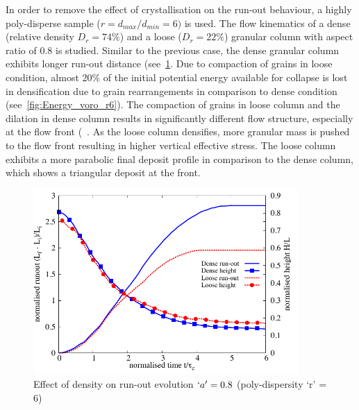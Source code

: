 In order to remove the effect of crystallisation on the run-out behaviour, a 
highly poly-disperse sample ($r = d_{max}/d_{min} = 6)$ is used. 
The flow kinematics of a dense (relative density $D_r = 74\%$) and a loose 
($D_r = 22\%$) granular column with aspect ratio of 0.8 is studied. Similar to 
the previous case, the dense granular column exhibits longer run-out distance 
(see~\cref{fig:runout_height_dense_r6}. Due to compaction of grains in loose 
condition, almost 20\% of the initial potential energy available for collapse 
is lost in densification due to grain rearrangements in comparison to dense 
condition (see~\cref{fig:Energy_voro_r6}). The compaction of grains in loose 
column and the dilation in dense column results in significantly different flow 
structure, especially at the flow front (~. As the loose 
column densifies, more granular mass is pushed to the flow front resulting in 
higher vertical effective stress. The loose column exhibits a more parabolic 
final deposit profile in comparison to the dense column, which shows a 
triangular deposit at the front.

\begin{figure}[tbhp]
\centering
\includegraphics[width=0.9\textwidth]{runout_height_dense_r6}
\caption{Effect of density on run-out evolution $`a' = 0.8$ (poly-dispersity 
`r' = 6)}
\label{fig:runout_height_dense_r6}
\end{figure}


